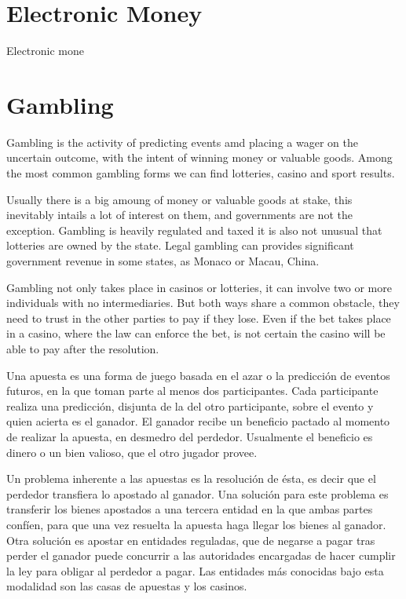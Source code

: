 \begin{intro}


\section{Electronic Money}
Electronic mone

\section{Gambling}
Gambling is the activity of predicting events amd placing a wager on the
  uncertain outcome, with the intent of winning money or valuable goods.
  Among the most common gambling forms we can find lotteries, casino and sport
  results.

Usually there is a big amoung of money or valuable goods at stake, this
  inevitably intails a lot of interest on them, and governments are not the
  exception.
  Gambling is heavily regulated and taxed it is also not unusual that
  lotteries are owned by the state. Legal gambling can provides significant
  government revenue in some states, as Monaco or Macau, China.

Gambling not only takes place in casinos or lotteries, it can involve two
  or more individuals with no intermediaries.
  But both ways share a common obstacle, they need to trust in the other
  parties to pay if they lose.
  Even if the bet takes place in a casino, where the law can enforce the bet,
  is not certain the casino will be able to pay after the resolution.




Una apuesta es una forma de juego basada en el azar o la predicci\'on de eventos
  futuros, en la que toman parte al menos dos participantes. Cada participante
  realiza una predicci\'on, disjunta de la del otro participante, sobre el evento y
  quien acierta es el ganador. El ganador recibe un beneficio pactado al momento de
  realizar la apuesta, en desmedro del perdedor. Usualmente el beneficio es dinero
  o un bien valioso, que el otro jugador provee.

Un problema inherente a las apuestas es la resoluci\'on de \'esta, es decir que el
  perdedor transfiera lo apostado al ganador. Una soluci\'on para este problema
  es transferir los bienes apostados a una tercera entidad en la que ambas
  partes confíen, para que una vez resuelta la apuesta haga llegar los bienes al
  ganador. Otra soluci\'on es apostar en entidades reguladas, que de negarse
  a pagar tras perder el ganador puede concurrir a las autoridades encargadas
  de hacer cumplir la ley para obligar al perdedor a pagar. Las entidades m\'as
  conocidas bajo esta modalidad son las casas de apuestas y los casinos.


\end{intro}
